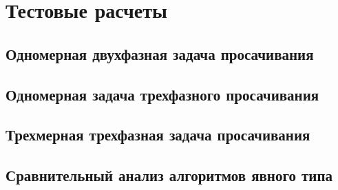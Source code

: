 \chapter{Тестовые расчеты} \label{ch:ch3}

\section{Одномерная двухфазная задача просачивания} \label{ch:ch3/sect1}

\section{Одномерная задача трехфазного просачивания} \label{ch:ch3/sect2}

\section{Трехмерная трехфазная задача просачивания} \label{ch:ch3/sect3}

\section{Сравнительный анализ алгоритмов явного типа} \label{ch:ch3/sect4}
